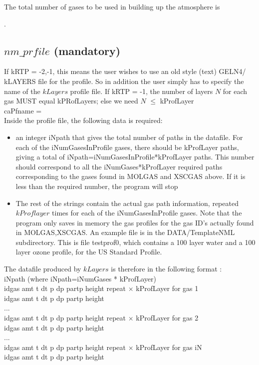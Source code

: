 \documentclass[12pt]{article}
\newcommand{\ttab}{\indent\indent}
\begin{document}
{The total number of gases to be used in building up the atmosphere is

\medskip
\ttab {\sf iN = iNumGases = iNgas + iNxsec}. 

\subsection{$nm\_prfile$ (mandatory)}

\label{inprofile}

If kRTP = -2,-1, this means the user wishes to use an old style (text) GELN4/
kLAYERS file for the profile. So in addition the user simply has to specify 
the name  of the $kLayers$ profile file. If kRTP = -1, the number of layers $N$
for each gas MUST equal kPRofLayers; else we need $N$ $\le$ kProfLayer\\
{\sf 
\ttab caPfname = \\
}
Inside the profile file, the following data is required: \\
\begin{itemize}
\item an integer iNpath that gives the total number of paths in the datafile. 
   For each of the iNumGasesInProfile gases, there should be kProfLayer paths,
  giving a total of iNpath=iNumGasesInProfile*kProfLayer paths. This number 
  should correspond to all the iNumGases*kProfLayer required paths 
  corresponding to the gases found in MOLGAS and XSCGAS above. If it is less 
  than the required number, the program will stop
\item The rest of the  strings contain the actual gas path information, 
   repeated $kProflayer$ times for each of the iNumGasesInProfile gases.  
   Note that the program only saves in memory the gas profiles for the gas 
   ID's actually found in MOLGAS,XSCGAS. An example file is in the 
   {\sf DATA/TemplateNML} subdirectory. This is file {\sf testprof0}, which 
   contains a 100 layer water and a 100 layer ozone profile, for the US 
   Standard Profile.  
\end{itemize}

The datafile produced by $kLayers$ is therefore in the following format : \\
\medskip
{\sf 
\ttab  iNpath              (where iNpath=iNumGases * kProfLayer)\\
\ttab  idgas amt t dt p dp partp height
\hspace{0.25in} repeat $\times$ kProfLayer  for gas 1\\
\ttab  idgas amt t dt p dp partp height\\
\ttab ...\\
\ttab  idgas amt t dt p dp partp height
\hspace{0.25in} repeat $\times$ kProfLayer for gas 2\\  
\ttab  idgas amt t dt p dp partp height\\
\ttab ...\\
\ttab  idgas amt t dt p dp partp height
\hspace{0.25in} repeat $\times$ kProfLayer  for gas iN\\  
\ttab  idgas amt t dt p dp partp height\\
}

}
\end{document}
